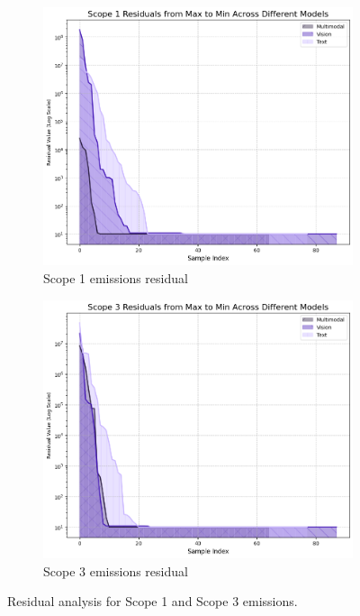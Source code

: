 \documentclass[english, 12pt, a4paper, elec, utf8, a-2b, online]{aaltothesis}
\begin{document}
\begin{figure}[H]
    \centering
    \begin{subfigure}[b]{0.48\textwidth}
        \includegraphics[width=\textwidth]{images/scope1_residuals.png}
        \caption{Scope 1 emissions residual}
        \label{fig:scope_1_residual}
    \end{subfigure}
    \hfill
    \begin{subfigure}[b]{0.48\textwidth}
        \includegraphics[width=\textwidth]{images/scope3_residuals.png}
        \caption{Scope 3 emissions residual}
        \label{fig:scope_3_residual}
    \end{subfigure}
    \caption{Residual analysis for Scope 1 and Scope 3 emissions.}
    \label{fig:scope_1_3_residual_analysis}
\end{figure}
\end{document}
